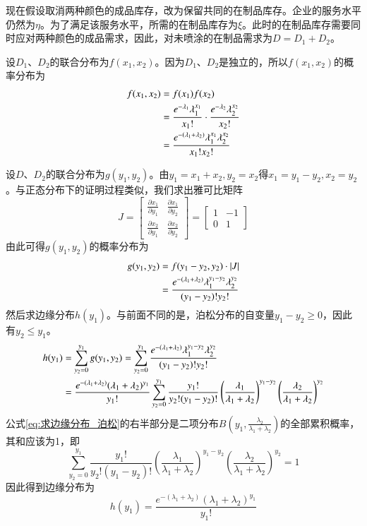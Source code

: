 现在假设取消两种颜色的成品库存，改为保留共同的在制品库存。企业的服务水平仍然为$\eta$。为了满足该服务水平，所需的在制品库存为$\xi$。此时的在制品库存需要同时应对两种颜色的成品需求，因此，对未喷涂的在制品需求为$D=D_1+D_2$。

设$D_1$、$D_2$的联合分布为$f(x_1,x_2)$。因为$D_1$、$D_2$是独立的，所以$f(x_1,x_2)$的概率分布为
\begin{align}
f(x_1,x_2) &= f(x_1)f(x_2) \notag\\
&= \frac{e^{-\lambda_1}\lambda_1^{x_1}}{x_1!} \cdot \frac{e^{-\lambda_2}\lambda_2^{x_2}}{x_2!} \notag\\
&= \frac{e^{-(\lambda_1+\lambda_2)}\lambda_1^{x_1}\lambda_2^{x_2}}{x_1!x_2!}
\label{eq:联合分布_泊松}
\end{align}

设$D$、$D_2$的联合分布为$g(y_1,y_2)$。由$y_1=x_1+x_2,y_2=x_2$得$x_1=y_1-y_2,x_2=y_2$。与正态分布下的证明过程类似，我们求出雅可比矩阵
\[
J = \begin{bmatrix}
\frac{\partial x_1}{\partial y_1} & \frac{\partial x_1}{\partial y_2} \\
\frac{\partial x_2}{\partial y_1} & \frac{\partial x_2}{\partial y_2}
\end{bmatrix} = \begin{bmatrix}
1 & -1 \\
0 & 1
\end{bmatrix}
\]
由此可得$g(y_1,y_2)$的概率分布为
\begin{align}
g(y_1,y_2) &= f(y_1-y_2,y_2)\cdot\left|J\right| \notag\\
&= \frac{e^{-(\lambda_1+\lambda_2)}\lambda_1^{y_1-y_2}\lambda_2^{y_2}}{(y_1-y_2)!y_2!}
\label{eq:新联合分布_泊松}
\end{align}
然后求边缘分布$h(y_1)$。与前面不同的是，泊松分布的自变量$y_1-y_2\geq 0$，因此有$y_2\leq y_1$。
\begin{align}
h(y_1) &= \sum_{y_2=0}^{y_1}g(y_1,y_2) = \sum_{y_2=0}^{y_1}\frac{e^{-(\lambda_1+\lambda_2)}\lambda_1^{y_1-y_2}\lambda_2^{y_2}}{(y_1-y_2)!y_2!} \notag\\
&= \frac{e^{-(\lambda_1+\lambda_2)}(\lambda_1+\lambda_2)^{y_1}}{y_1!}\sum_{y_2=0}^{y_1}\frac{y_1!}{y_2!(y_1-y_2)!}\left(\frac{\lambda_1}{\lambda_1+\lambda_2}\right)^{y_1-y_2}\left(\frac{\lambda_2}{\lambda_1+\lambda_2}\right)^{y_2}
\label{eq:求边缘分布_泊松}
\end{align}
公式\ref{eq:求边缘分布_泊松}的右半部分是二项分布$B(y_1,\frac{\lambda_2}{\lambda_1+\lambda_2})$的全部累积概率，其和应该为1，即
\[
\sum_{y_2=0}^{y_1}\frac{y_1!}{y_2!(y_1-y_2)!}\left(\frac{\lambda_1}{\lambda_1+\lambda_2}\right)^{y_1-y_2}\left(\frac{\lambda_2}{\lambda_1+\lambda_2}\right)^{y_2} = 1
\]
因此得到边缘分布为
\begin{equation}
h(y_1) = \frac{e^{-(\lambda_1+\lambda_2)}(\lambda_1+\lambda_2)^{y_1}}{y_1!}
\label{eq:边缘分布结果_泊松}
\end{equation}

